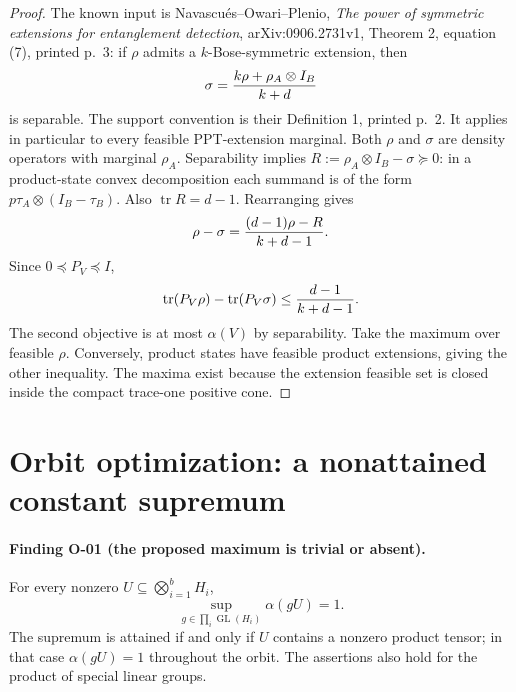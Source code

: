 \begin{proof}
The known input is Navascu\'es--Owari--Plenio,
\emph{The power of symmetric extensions for entanglement detection},
arXiv:0906.2731v1, Theorem 2, equation (7), printed p.~3:
if $\rho$ admits a $k$-Bose-symmetric extension, then
\[
 \sigma={k\rho+\rho_A\otimes I_B\over k+d}
\]
is separable. The support convention is their Definition 1,
printed p.~2. It applies in particular to every feasible
PPT-extension marginal. Both $\rho$ and $\sigma$ are density
operators with marginal $\rho_A$. Separability implies
$R:=\rho_A\otimes I_B-\sigma\succeq0$: in a product-state
convex decomposition each summand is of the form
$p\tau_A\otimes(I_B-\tau_B)$. Also $\operatorname{tr}R=d-1$.
Rearranging gives
\[
 \rho-\sigma={(d-1)\rho-R\over k+d-1}.
\]
Since $0\preceq P_V\preceq I$,
\[
 \operatorname{tr}(P_V\rho)-\operatorname{tr}(P_V\sigma)
 \leq {d-1\over k+d-1}.
\]
The second objective is at most $\alpha(V)$ by separability.
Take the maximum over feasible $\rho$. Conversely, product
states have feasible product extensions, giving the other
inequality. The maxima exist because the extension feasible
set is closed inside the compact trace-one positive cone.
\end{proof}

\section{Orbit optimization: a nonattained constant supremum}
\label{sec:orbit-alpha}

\paragraph{Finding O-01 (the proposed maximum is trivial or absent).}
For every nonzero $U\subseteq\bigotimes_{i=1}^b H_i$,
\begin{equation}\label{eq:orbit-alpha-sup}
 \sup_{g\in\prod_i\operatorname{GL}(H_i)}\alpha(gU)=1.
\end{equation}
The supremum is attained if and only if $U$ contains a nonzero
product tensor; in that case $\alpha(gU)=1$ throughout the orbit.
The assertions also hold for the product of special linear groups.


